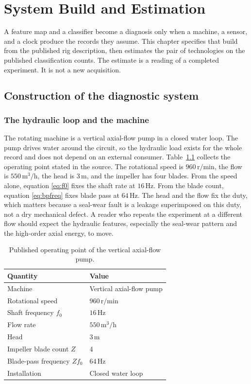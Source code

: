 \chapter{System Build and Estimation}
\label{ch:estimation}

A feature map and a classifier become a diagnosis only when a machine, a sensor, and a clock produce the records they assume.
This chapter specifies that build from the published rig description, then estimates the pair of technologies on the published classification counts.
The estimate is a reading of a completed experiment.
It is not a new acquisition.

\section{Construction of the diagnostic system}
\label{sec:build}

\subsection{The hydraulic loop and the machine}

The rotating machine is a vertical axial-flow pump in a closed water loop.
The pump drives water around the circuit, so the hydraulic load exists for the whole record and does not depend on an external consumer.
Table~\ref{tab:rig} collects the operating point stated in the source.
The rotational speed is \(960\,\mathrm{r/min}\), the flow is \(550\,\mathrm{m}^{3}/\mathrm{h}\), the head is \(3\,\mathrm{m}\), and the impeller has four blades.
From the speed alone, equation \eqref{eq:f0} fixes the shaft rate at \(16\,\mathrm{Hz}\).
From the blade count, equation \eqref{eq:bpfreq} fixes blade pass at \(64\,\mathrm{Hz}\).
The head and the flow fix the duty, which matters because a seal-wear fault is a leakage superimposed on this duty, not a dry mechanical defect.
A reader who repeats the experiment at a different flow should expect the hydraulic features, especially the seal-wear pattern and the high-order axial energy, to move.

\begin{table}[H]
\centering
\caption{Published operating point of the vertical axial-flow pump.}
\label{tab:rig}
\begin{tabular}{ll}
\toprule
Quantity & Value \\
\midrule
Machine & Vertical axial-flow pump \\
Rotational speed & \(960\,\mathrm{r/min}\) \\
Shaft frequency \(f_{0}\) & \(16\,\mathrm{Hz}\) \\
Flow rate & \(550\,\mathrm{m}^{3}/\mathrm{h}\) \\
Head & \(3\,\mathrm{m}\) \\
Impeller blade count \(Z\) & \(4\) \\
Blade-pass frequency \(Z f_{0}\) & \(64\,\mathrm{Hz}\) \\
Installation & Closed water loop \\
\bottomrule
\end{tabular}
\end{table}

